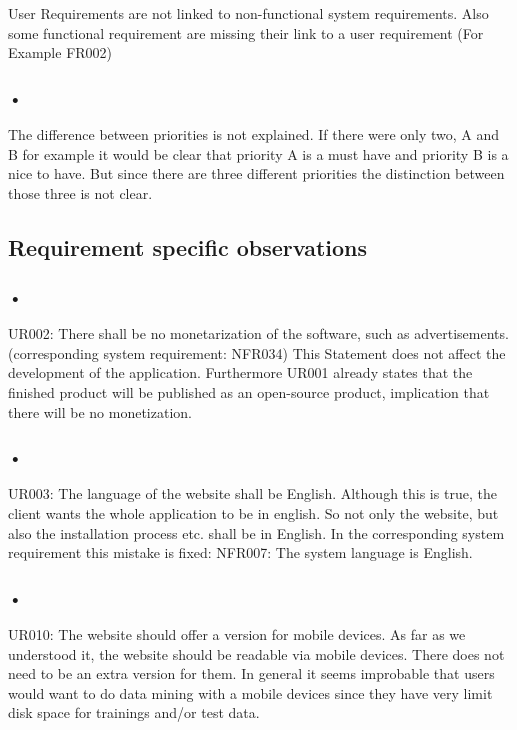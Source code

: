 \documentclass{article}
\begin{document}
\subsubsection{}
User Requirements are not linked to non-functional system requirements. Also some functional requirement are missing their link to a user requirement (For Example FR002)
\subsubsection{•}
The difference between priorities is not explained. If there were only two, A and B for example it would be clear that priority A is a must have and priority B is a nice to have. But since there are three different priorities the distinction between those three is not clear.

\subsection{Requirement specific observations}
 
\subsubsection{•}
UR002: There shall be no monetarization of the software, such as advertisements. (corresponding system requirement: NFR034)
This Statement does not affect the development of the application. Furthermore UR001 already states that the finished product will be published as an open-source product, implication that there will be no monetization.

\subsubsection{•}
UR003: The language of the website shall be English. 
Although this is true, the client wants the whole application to be in english. So not only the website, but also the installation process etc. shall be in English. In the corresponding system requirement this mistake is fixed: 
NFR007: The system language is English.
 
\subsubsection{•}
UR010: The website should offer a version for mobile devices. 
As far as we understood it, the website should be readable via mobile devices. There does not need to be an extra version for them. In general it seems improbable that users would want to do data mining with a mobile devices since they have very limit disk space for trainings and/or test data.
 
\end{document}
